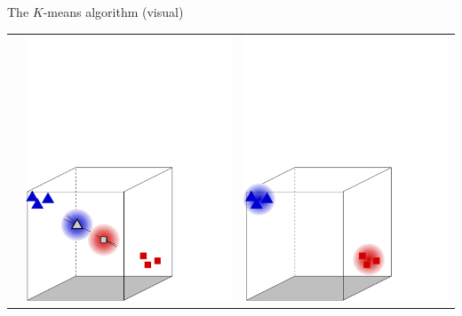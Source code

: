 \documentclass{beamer}
\begin{document}
\begin{frame}{The $K$-means algorithm (visual)}
\begin{tabular}{ccc}
&
\includegraphics[height=0.4\textheight]{3d-kmeans3.pdf}
&
\includegraphics[height=0.4\textheight]{3d-kmeans4.pdf}
\end{tabular}


\end{frame}
\end{document}

